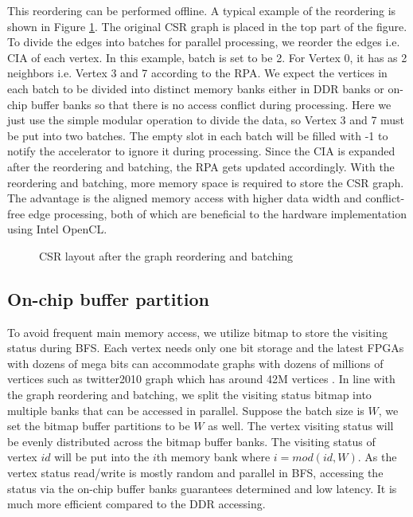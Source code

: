This reordering can be performed offline.
A typical example of the reordering is shown in Figure \ref{fig:graph-reorder}. 
The original CSR graph is placed in the top part of the figure. 
To divide the edges into batches for parallel processing, we reorder the edges i.e. CIA 
of each vertex. In this example, batch is set to be 2. For Vertex 0, 
it has as 2 neighbors i.e. Vertex 3 and 7 according to the RPA. 
We expect the vertices in each batch to be divided into distinct memory 
banks either in DDR banks or on-chip buffer banks so that there is no 
access conflict during processing. Here we just use the simple modular 
operation to divide the data, so Vertex 3 and 7 must be put into two batches.
The empty slot in each batch will be filled with -1 to notify the accelerator to 
ignore it during processing. Since the CIA is expanded after 
the reordering and batching, the RPA gets updated accordingly.
With the reordering and batching, more memory space is required to store the 
CSR graph. The advantage is the aligned memory access 
with higher data width and conflict-free edge processing, 
both of which are beneficial to the hardware implementation 
using Intel OpenCL.

\begin{figure}
    \caption{CSR layout after the graph reordering and batching}
\label{fig:graph-reorder}
\vspace{-1em}
\end{figure}

\subsection{On-chip buffer partition}
To avoid frequent main memory access, we utilize bitmap to store 
the visiting status during BFS. Each vertex needs only one bit 
storage and the latest FPGAs with dozens of mega bits can accommodate 
graphs with dozens of millions of vertices such as twitter2010 graph which has 
around 42M vertices \cite{boldi2011layered}. In line with the graph reordering 
and batching, we split the visiting status bitmap into multiple banks that 
can be accessed in parallel. Suppose the batch size is $W$, we set the 
bitmap buffer partitions to be $W$ as well. The vertex visiting status will 
be evenly distributed across the bitmap buffer banks. The visiting status of 
vertex $id$ will be put into the $i$th memory bank where $i = mod(id, W)$.
As the vertex status read/write is mostly random and parallel in BFS, 
accessing the status via the on-chip buffer banks guarantees determined 
and low latency. It is much more efficient compared to the DDR 
accessing. 

